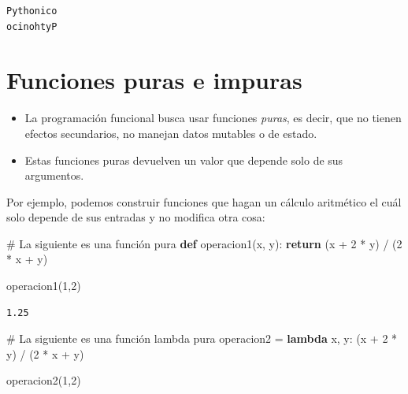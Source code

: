 \documentclass[
  spanish,
  letterpaper,
]{scrbook}
\newenvironment{Shaded}{\begin{snugshade}}{\end{snugshade}}
\newcommand{\CommentTok}[1]{\textcolor[rgb]{0.37,0.37,0.37}{#1}}
\newcommand{\ControlFlowTok}[1]{\textcolor[rgb]{0.00,0.23,0.31}{\textbf{#1}}}
\newcommand{\DecValTok}[1]{\textcolor[rgb]{0.68,0.00,0.00}{#1}}
\newcommand{\KeywordTok}[1]{\textcolor[rgb]{0.00,0.23,0.31}{\textbf{#1}}}
\newcommand{\NormalTok}[1]{\textcolor[rgb]{0.00,0.23,0.31}{#1}}
\newcommand{\OperatorTok}[1]{\textcolor[rgb]{0.37,0.37,0.37}{#1}}
\theoremstyle{definition}
\theoremstyle{remark}
\begin{document}
\begin{verbatim}
Pythonico
ocinohtyP
\end{verbatim}

\section{Funciones puras e impuras}\label{funciones-puras-e-impuras}

\begin{itemize}
\item
  La programación funcional busca usar funciones \emph{puras}, es decir,
  que no tienen efectos secundarios, no manejan datos mutables o de
  estado.
\item
  Estas funciones puras devuelven un valor que depende solo de sus
  argumentos.
\end{itemize}

Por ejemplo, podemos construir funciones que hagan un cálculo aritmético
el cuál solo depende de sus entradas y no modifica otra cosa:

\begin{Shaded}
\begin{Highlighting}[]
\CommentTok{\# La siguiente es una función pura}
\KeywordTok{def}\NormalTok{ operacion1(x, y):}
    \ControlFlowTok{return}\NormalTok{ (x }\OperatorTok{+} \DecValTok{2} \OperatorTok{*}\NormalTok{ y) }\OperatorTok{/}\NormalTok{ (}\DecValTok{2} \OperatorTok{*}\NormalTok{ x }\OperatorTok{+}\NormalTok{ y)}

\NormalTok{operacion1(}\DecValTok{1}\NormalTok{,}\DecValTok{2}\NormalTok{)}
\end{Highlighting}
\end{Shaded}

\begin{verbatim}
1.25
\end{verbatim}

\begin{Shaded}
\begin{Highlighting}[]
\CommentTok{\# La siguiente es una función lambda pura}
\NormalTok{operacion2 }\OperatorTok{=} \KeywordTok{lambda}\NormalTok{ x, y: (x }\OperatorTok{+} \DecValTok{2} \OperatorTok{*}\NormalTok{ y) }\OperatorTok{/}\NormalTok{ (}\DecValTok{2} \OperatorTok{*}\NormalTok{ x }\OperatorTok{+}\NormalTok{ y)}

\NormalTok{operacion2(}\DecValTok{1}\NormalTok{,}\DecValTok{2}\NormalTok{)}
\end{Highlighting}
\end{Shaded}
\end{document}
